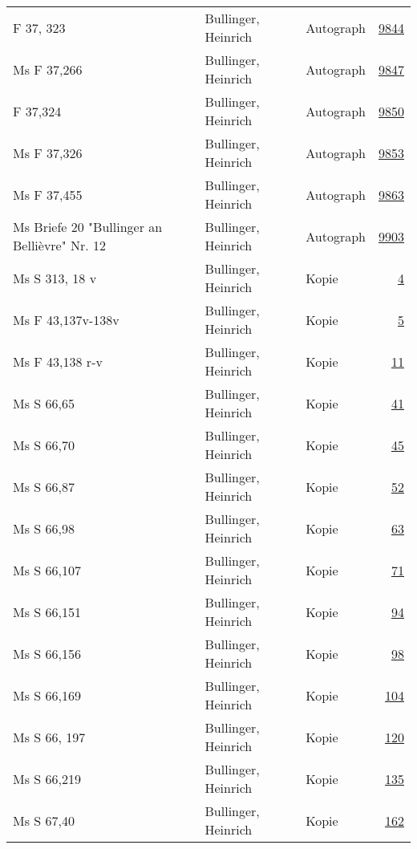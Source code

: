 \documentclass[10pt,a4paper,landscape]{report}
\begin{document}
\begin{longtable}{p{16cm}p{4cm}lr}
F 37, 323	&	Bullinger, Heinrich	&	Autograph	&	\href{http://130.60.24.72/assignment/9844}{9844}\\
Ms F 37,266	&	Bullinger, Heinrich	&	Autograph	&	\href{http://130.60.24.72/assignment/9847}{9847}\\
F 37,324	&	Bullinger, Heinrich	&	Autograph	&	\href{http://130.60.24.72/assignment/9850}{9850}\\
Ms F 37,326	&	Bullinger, Heinrich	&	Autograph	&	\href{http://130.60.24.72/assignment/9853}{9853}\\
Ms F 37,455	&	Bullinger, Heinrich	&	Autograph	&	\href{http://130.60.24.72/assignment/9863}{9863}\\
Ms Briefe 20 "Bullinger an Bellièvre" Nr. 12	&	Bullinger, Heinrich	&	Autograph	&	\href{http://130.60.24.72/assignment/9903}{9903}\\
Ms S 313, 18 v	&	Bullinger, Heinrich	&	Kopie	&	\href{http://130.60.24.72/assignment/4}{4}\\
Ms F 43,137v-138v	&	Bullinger, Heinrich	&	Kopie	&	\href{http://130.60.24.72/assignment/5}{5}\\
Ms F 43,138 r-v	&	Bullinger, Heinrich	&	Kopie	&	\href{http://130.60.24.72/assignment/11}{11}\\
Ms S 66,65	&	Bullinger, Heinrich	&	Kopie	&	\href{http://130.60.24.72/assignment/41}{41}\\
Ms S 66,70	&	Bullinger, Heinrich	&	Kopie	&	\href{http://130.60.24.72/assignment/45}{45}\\
Ms S 66,87	&	Bullinger, Heinrich	&	Kopie	&	\href{http://130.60.24.72/assignment/52}{52}\\
Ms S 66,98	&	Bullinger, Heinrich	&	Kopie	&	\href{http://130.60.24.72/assignment/63}{63}\\
Ms S 66,107	&	Bullinger, Heinrich	&	Kopie	&	\href{http://130.60.24.72/assignment/71}{71}\\
Ms S 66,151	&	Bullinger, Heinrich	&	Kopie	&	\href{http://130.60.24.72/assignment/94}{94}\\
Ms S 66,156	&	Bullinger, Heinrich	&	Kopie	&	\href{http://130.60.24.72/assignment/98}{98}\\
Ms S 66,169	&	Bullinger, Heinrich	&	Kopie	&	\href{http://130.60.24.72/assignment/104}{104}\\
Ms S 66, 197	&	Bullinger, Heinrich	&	Kopie	&	\href{http://130.60.24.72/assignment/120}{120}\\
Ms S 66,219	&	Bullinger, Heinrich	&	Kopie	&	\href{http://130.60.24.72/assignment/135}{135}\\
Ms S 67,40	&	Bullinger, Heinrich	&	Kopie	&	\href{http://130.60.24.72/assignment/162}{162}\\

\end{longtable}
\end{document}
